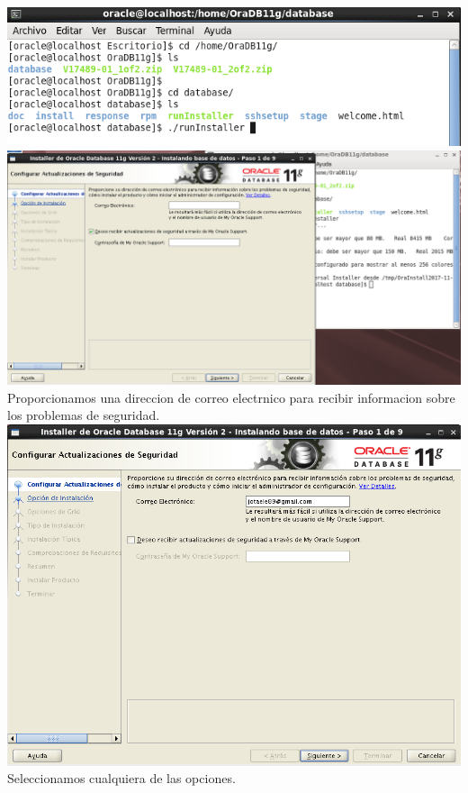 \documentclass[a4paper,openright,12pt]{book}
\begin{document}
\begin{center}
\includegraphics[width=15cm]{./oracle linux/10.png}
\includegraphics[width=15cm]{./oracle linux/11.png}
Proporcionamos una direccion de correo electrnico para recibir informacion sobre los problemas de seguridad.\\
\includegraphics[width=15cm]{./oracle linux/12.png}
Seleccionamos cualquiera de las opciones.\\

\end{center}
\end{document}
